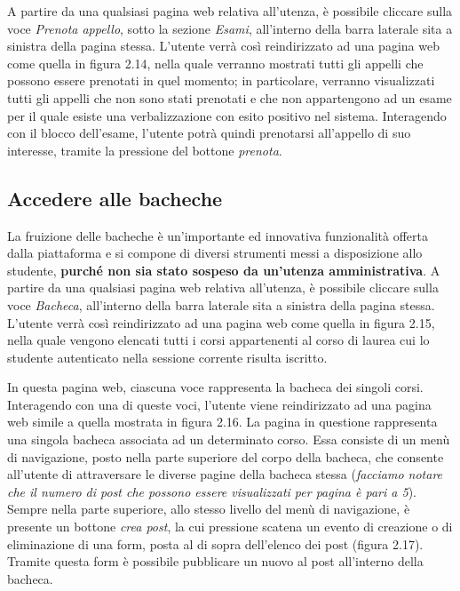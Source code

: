 \documentclass [a4paper,11pt]{book}
\begin{document}
A partire da una qualsiasi pagina web relativa all'utenza, è possibile cliccare sulla voce \emph{Prenota appello}, sotto la sezione \emph{Esami}, all'interno della barra laterale sita a sinistra della pagina stessa. L'utente verrà così reindirizzato ad una pagina web come quella in figura 2.14, nella quale verranno mostrati tutti gli appelli che possono essere prenotati in quel momento; in particolare, verranno visualizzati tutti gli appelli che non sono stati prenotati e che non appartengono ad un esame per il quale esiste una verbalizzazione con esito positivo nel sistema. Interagendo con il blocco dell'esame, l'utente potrà quindi prenotarsi all'appello di suo interesse, tramite la pressione del bottone \emph{prenota}.


\medskip

\subsection{Accedere alle bacheche}

La fruizione delle bacheche è un'importante ed innovativa funzionalità offerta dalla piattaforma e si compone di diversi strumenti messi a disposizione allo studente, \textbf{purché non sia stato sospeso da un'utenza amministrativa}. A partire da una qualsiasi pagina web relativa all'utenza, è possibile cliccare sulla voce \emph{Bacheca}, all'interno della barra laterale sita a sinistra della pagina stessa. L'utente verrà così reindirizzato ad una pagina web come quella in figura 2.15, nella quale vengono elencati tutti i corsi appartenenti al corso di laurea cui lo studente autenticato nella sessione corrente risulta iscritto.


In questa pagina web, ciascuna voce rappresenta la bacheca dei singoli corsi. Interagendo con una di queste voci, l'utente viene reindirizzato ad una pagina web simile a quella mostrata in figura 2.16. La pagina in questione rappresenta una singola bacheca associata ad un determinato corso. Essa consiste di un menù di navigazione, posto nella parte superiore del corpo della bacheca, che consente all'utente di attraversare le diverse pagine della bacheca stessa (\emph{facciamo notare che il numero di post che possono essere visualizzati per pagina è pari a 5}). Sempre nella parte superiore, allo stesso livello del menù di navigazione, è presente un bottone \emph{crea post}, la cui pressione scatena un evento di creazione o di eliminazione di una form, posta al di sopra dell'elenco dei post (figura 2.17). Tramite questa form è possibile pubblicare un nuovo al post all'interno della bacheca.
\end{document}
